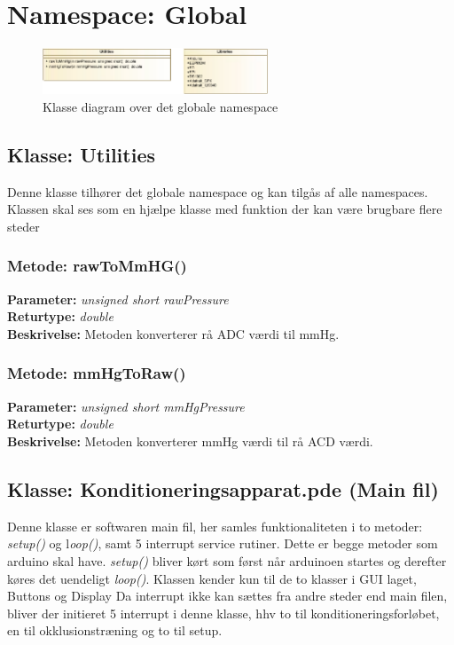 \section{Namespace: Global}

\begin{figure}[H]
	\centering
	\includegraphics[width=0.6\textwidth]{klassediagram_extra-crop.pdf}
	\caption{Klasse diagram over det globale namespace}\label{fig:classDiagramextra}
\end{figure}

\subsection{Klasse: Utilities}
Denne klasse tilhører det globale namespace og kan tilgås af alle namespaces. Klassen skal ses som en hjælpe klasse med funktion der kan være brugbare flere steder

\subsubsection{Metode: rawToMmHG()}
\textbf{Parameter: } \textit{unsigned short rawPressure}
\\ \textbf{Returtype: } \textit{double}
\\ \textbf{Beskrivelse: } Metoden konverterer rå ADC værdi til mmHg.

\subsubsection{Metode: mmHgToRaw()}
\textbf{Parameter: } \textit{unsigned short mmHgPressure}
\\ \textbf{Returtype: } \textit{double}
\\ \textbf{Beskrivelse: } Metoden konverterer mmHg værdi til rå ACD værdi.

\subsection{Klasse: Konditioneringsapparat.pde (Main fil)}
Denne klasse er softwaren main fil, her samles funktionaliteten i to metoder: \textit{setup()} og l\textit{oop()}, samt 5 interrupt service rutiner. Dette er begge metoder som arduino skal have. \textit{setup()} bliver kørt som først når arduinoen startes og derefter køres det uendeligt \textit{loop()}. Klassen kender kun til de to klasser i GUI laget, Buttons og Display
Da interrupt ikke kan sættes fra andre steder end main filen, bliver der initieret 5 interrupt i denne klasse, hhv to til konditioneringsforløbet, en til okklusionstræning og to til setup.


